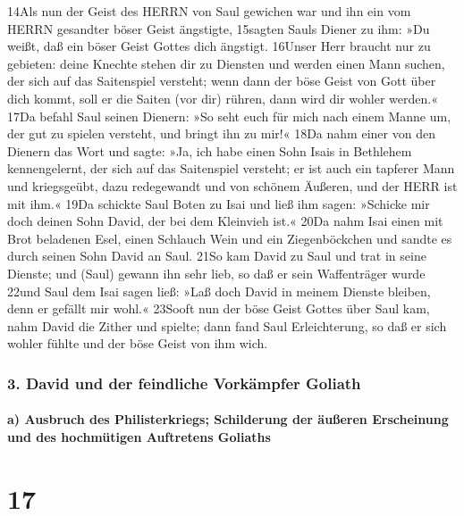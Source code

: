 14Als nun der Geist des HERRN von Saul gewichen war und ihn ein vom
HERRN gesandter böser Geist ängstigte, 15sagten Sauls Diener zu ihm: »Du
weißt, daß ein böser Geist Gottes dich ängstigt. 16Unser Herr braucht
nur zu gebieten: deine Knechte stehen dir zu Diensten und werden einen
Mann suchen, der sich auf das Saitenspiel versteht; wenn dann der böse
Geist von Gott über dich kommt, soll er die Saiten (vor dir) rühren,
dann wird dir wohler werden.« 17Da befahl Saul seinen Dienern: »So seht
euch für mich nach einem Manne um, der gut zu spielen versteht, und
bringt ihn zu mir!« 18Da nahm einer von den Dienern das Wort und sagte:
»Ja, ich habe einen Sohn Isais in Bethlehem kennengelernt, der sich auf
das Saitenspiel versteht; er ist auch ein tapferer Mann und kriegsgeübt,
dazu redegewandt und von schönem Äußeren, und der HERR ist mit ihm.«
19Da schickte Saul Boten zu Isai und ließ ihm sagen: »Schicke mir doch
deinen Sohn David, der bei dem Kleinvieh ist.« 20Da nahm Isai einen mit
Brot beladenen Esel, einen Schlauch Wein und ein Ziegenböckchen und
sandte es durch seinen Sohn David an Saul. 21So kam David zu Saul und
trat in seine Dienste; und (Saul) gewann ihn sehr lieb, so daß er sein
Waffenträger wurde 22und Saul dem Isai sagen ließ: »Laß doch David in
meinem Dienste bleiben, denn er gefällt mir wohl.« 23Sooft nun der böse
Geist Gottes über Saul kam, nahm David die Zither und spielte; dann fand
Saul Erleichterung, so daß er sich wohler fühlte und der böse Geist von
ihm wich.

\hypertarget{david-und-der-feindliche-vorkuxe4mpfer-goliath}{%
\subsubsection{3. David und der feindliche Vorkämpfer
Goliath}\label{david-und-der-feindliche-vorkuxe4mpfer-goliath}}

\hypertarget{a-ausbruch-des-philisterkriegs-schilderung-der-uxe4uuxdferen-erscheinung-und-des-hochmuxfctigen-auftretens-goliaths}{%
\paragraph{a) Ausbruch des Philisterkriegs; Schilderung der äußeren
Erscheinung und des hochmütigen Auftretens
Goliaths}\label{a-ausbruch-des-philisterkriegs-schilderung-der-uxe4uuxdferen-erscheinung-und-des-hochmuxfctigen-auftretens-goliaths}}

\hypertarget{section-16}{%
\section{17}\label{section-16}}

